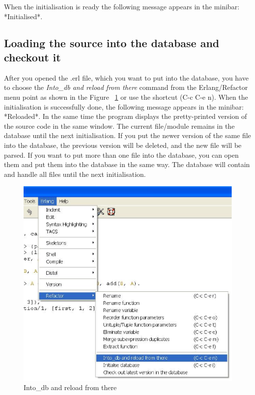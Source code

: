 \documentclass[12pt]{article}
\begin{document}
When the initialisation is ready the following message appears in the minibar: *Initialised*.

\subsection{Loading the source into the database and checkout it}

After you opened the .erl file, which you want to put into the database, 
you have to choose the {\it Into\_db and reload from there} command from the Erlang/Refactor menu point as shown in the Figure ~\ref{load} 
or use the shortcut (C-c C-e n).
When the initialisation is successfully done, the following message appears in the minibar: *Reloaded*. 
In the same time the program displays the pretty-printed version of the source code in the same window.
The current file/module remains in the database until the next initialisation. 
If you put the newer version of the same file into the database, the previous version will be deleted, and  the new file will be parsed.
If you want to put more than one file into the database, you can open them and put them into the database in the same way. 
The database will contain and handle all files until the next initialisation.

\begin{center}
\begin{figure}[htbp]

    \includegraphics[scale=0.80]{load.eps}
   \caption{Into\_db and reload from there}
  \label{load}
\end{figure}
\end{center}
\end{document}
